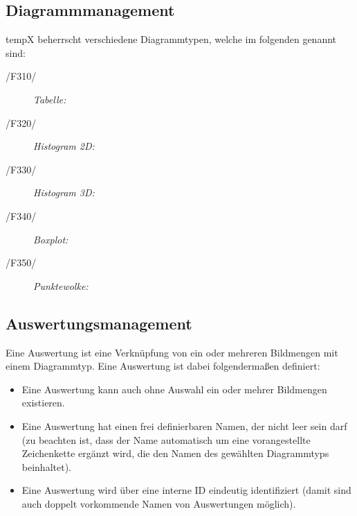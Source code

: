 \subsection{Diagrammmanagement}

\label{subsec:diagrammmgmt}

	\gls{tempX} beherrscht verschiedene Diagrammtypen, welche im folgenden genannt sind:
	
	\begin{description}

		\item[/F310/] \textit{Tabelle:}\par 

		\item[/F320/] \textit{Histogram 2D:}\par 

		\item[/F330/] \textit{Histogram 3D:}\par 

		\item[/F340/] \textit{Boxplot:}\par 

		\item[/F350/] \textit{Punktewolke:}\par 

	\end{description}

\subsection{Auswertungsmanagement}
\label{subsec:auswertungsmgmt}

	Eine Auswertung ist eine Verknüpfung von ein oder mehreren Bildmengen mit einem Diagrammtyp. Eine Auswertung ist dabei folgendermaßen definiert:

	\begin{itemize}

		\item Eine Auswertung kann auch ohne Auswahl ein oder mehrer Bildmengen existieren. 

		\item Eine Auswertung hat einen frei definierbaren Namen, der nicht leer sein darf (zu beachten ist, dass der Name automatisch um eine vorangestellte Zeichenkette ergänzt wird, die den Namen des gewählten Diagrammtyps beinhaltet).

		\item Eine Auswertung wird über eine interne ID eindeutig identifiziert (damit sind auch doppelt vorkommende Namen von Auswertungen möglich).

	\end{itemize}


